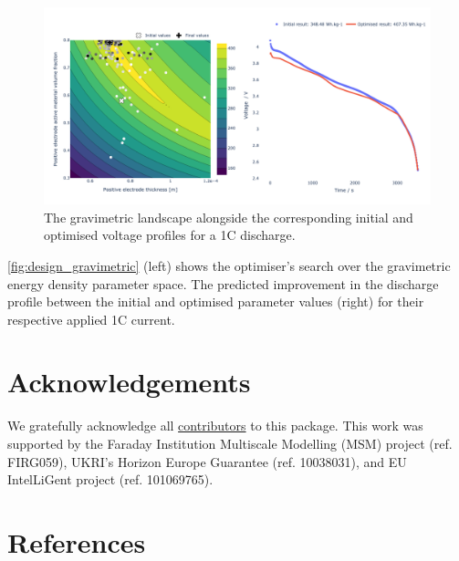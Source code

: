 \documentclass[
]{article}
\begin{document}
\begin{figure}
\centering
\includegraphics[width=1\textwidth,height=\textheight]{figures/joss/design.png}
\caption{The gravimetric landscape alongside the corresponding initial
and optimised voltage profiles for a 1C discharge.
\label{fig:design_gravimetric}}
\end{figure}

\autoref{fig:design_gravimetric} (left) shows the optimiser's search
over the gravimetric energy density parameter space. The predicted
improvement in the discharge profile between the initial and optimised
parameter values (right) for their respective applied 1C current.

\section{Acknowledgements}\label{acknowledgements}

We gratefully acknowledge all
\href{https://github.com/pybop-team/PyBOP?tab=readme-ov-file\#contributors-}{contributors}
to this package. This work was supported by the Faraday Institution
Multiscale Modelling (MSM) project (ref. FIRG059), UKRI's Horizon Europe
Guarantee (ref. 10038031), and EU IntelLiGent project (ref. 101069765).

\section*{References}\label{references}
\end{document}
